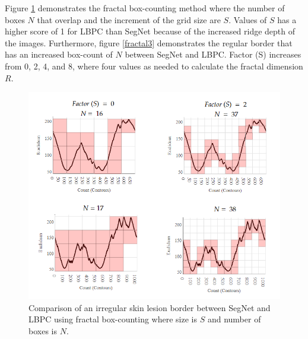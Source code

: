 \documentclass[10.5pt]{report}
\begin{document}
Figure \ref{fractal2} demonstrates the fractal box-counting method where the number of boxes  $N$ that overlap and the increment of the grid size are $S$. Values of $S$ has a higher score of 1 for LBPC than SegNet because of the increased ridge depth of the images. Furthermore, figure \ref{fractal3} demonstrates the regular border that has an increased box-count of $N$ between SegNet and LBPC. Factor (S) increases from 0, 2, 4, and 8, where four values as needed to calculate the fractal dimension $R$.

\begin{figure}

\includegraphics[scale=0.9]{lbpcvseg.png}

\caption{Comparison of an irregular skin lesion border between SegNet and LBPC using fractal box-counting where size is $S$ and number of boxes is $N$.} \label{fractal2}
\end{figure}
\end{document}
